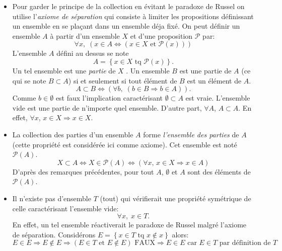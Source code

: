 \begin{itemize}
\item Pour garder le principe de la collection en évitant le paradoxe de Russel on utilise l'\emph{axiome de séparation} qui consiste à limiter les propositions définissant un ensemble en se plaçant dans un ensemble déja fixé. On peut définir un ensemble $A$ à partir d'un ensemble $X$ et d'une proposition $\mathcal{P}$ par:
\begin{displaymath}
\forall x, \; \left( x\in A \Leftrightarrow \left( x \in X \text{ et } \mathcal{P}(x) \right) \right)   
\end{displaymath}
L'ensemble $A$ défini au dessus se note 
\begin{displaymath}
  A = \left\lbrace x\in X \text{ tq } \mathcal{P}(x) \right\rbrace .
\end{displaymath}
Un tel ensemble est une \emph{partie} de $X$ .\newline
Un ensemble $B$ est une partie de $A$ (ce qui se note $B \subset A$) si et seulement si tout élément de $B$ est un élément de $A$.
\begin{displaymath}
A \subset B \Leftrightarrow \left(\forall b, \;\left( b\in B \Rightarrow b \in A \right)   \right)   .
\end{displaymath}
Comme $b \in \emptyset$ est faux l'implication caractérisant $\emptyset \subset A$ est vraie. L'ensemble vide est une partie de n'importe quel ensemble.\newline
D'autre part, $\forall A$, $A \subset A$. En effet, $\forall x$, $x\in X \Rightarrow x \in X$.

\item La collection des parties d'un ensemble $A$ forme \emph{l'ensemble des parties} de $A$ (cette propriété est considérée ici comme axiome). Cet ensemble est noté $\mathcal P (A)$.
\begin{displaymath}
X \subset A \Leftrightarrow X \in \mathcal{P}(A) \Leftrightarrow \left(\forall x,\,  x\in X \Rightarrow x \in A \right)   
\end{displaymath}
D'après des remarques précédentes, pour tout $A$, $\emptyset$ et $A$ sont des éléments de $\mathcal{P}(A)$.

\item Il n'existe pas d'ensemble $T$ (tout) qui vérifierait une propriété symétrique de celle caractérisant l'ensemble vide:
\begin{displaymath}
  \forall x,\;  x\in T .
\end{displaymath}
 En effet, un tel ensemble réactiverait le paradoxe de Russel malgré l'axiome de séparation. Considérons $E=\left\lbrace x\in T \text{ tq } x \notin x \right\rbrace$ alors:
\begin{displaymath}
 E\in E \Rightarrow E\notin E \Rightarrow \left( E\in T \text{ et } E\notin E\right)\text{ FAUX}
 \Rightarrow E \in E \text{ car } E\in T \text{ par définition de $T$}
\end{displaymath}


\end{itemize}
